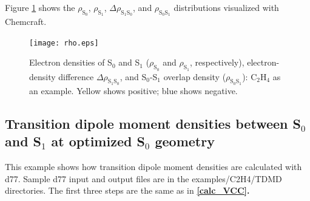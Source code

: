 ﻿\documentclass[11pt,a4paper,openany]{article}
\begin{document}
Figure \ref{fig:rho} shows the $\rho_{\mathrm{S}_0}$, $\rho_{\mathrm{S}_1}$, $\Delta\rho_{\mathrm{S}_1\mathrm{S}_0}$, and $\rho_{\mathrm{S}_0\mathrm{S}_1}$ distributions visualized with Chemcraft.\\
\begin{figure}[h]
\centering
\texttt{[image: rho.eps]}
\caption{
Electron densities of S$_0$ and S$_1$ ($\rho_{\mathrm{S}_0}$ and $\rho_{\mathrm{S}_1}$, respectively),
electron-density difference $\Delta\rho_{\mathrm{S}_1\mathrm{S}_0}$,
and S$_0$-S$_1$ overlap density ($\rho_{\mathrm{S}_0\mathrm{S}_1}$): C$_2$H$_4$ as an example.
Yellow shows positive; blue shows negative.
}
\label{fig:rho}
\end{figure}

\clearpage
\subsection{Transition dipole moment densities between S$_0$ and S$_1$ at optimized S$_0$ geometry}
This example shows how transition dipole moment densities are calculated with d77. 
Sample d77 input and output files are in the examples/C2H4/TDMD directories. The first three steps are the same as in \bf{\ref{calc_VCC}}\rm{.}
\end{document}

